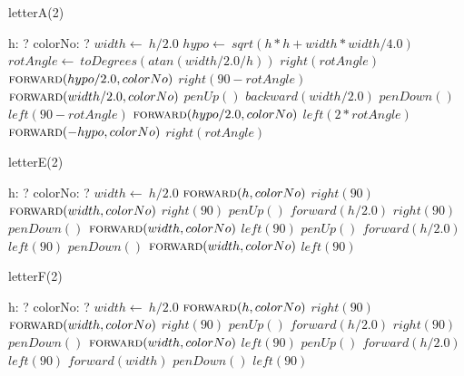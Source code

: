 \documentclass[a4paper,10pt]{article}
\begin{document}
\begin{algorithm}
\caption{letterA(2)}
\begin{algorithmic}[5]
\State {}
\State {}
    \State h: ?
    \State colorNo: ?
  \EndDecl
  \State \(width\gets\ h/2.0\)
  \State \(hypo\gets\ sqrt(h*h+width*width/4.0)\)
  \State \(rotAngle\gets\ toDegrees(atan(width/2.0/h))\)
  \State \(right(rotAngle)\)
  \State \(\Call{forward}{hypo/2.0,colorNo}\)
  \State \(right(90-rotAngle)\)
  \State \(\Call{forward}{width/2.0,colorNo}\)
  \State \(penUp()\)
  \State \(backward(width/2.0)\)
  \State \(penDown()\)
  \State \(left(90-rotAngle)\)
  \State \(\Call{forward}{hypo/2.0,colorNo}\)
  \State \(left(2*rotAngle)\)
  \State \(\Call{forward}{-hypo,colorNo}\)
  \State \(right(rotAngle)\)
\EndProcedure
\end{algorithmic}
\end{algorithm}


\begin{algorithm}
\caption{letterE(2)}
\begin{algorithmic}[5]
\State {}
\State {}
    \State h: ?
    \State colorNo: ?
  \EndDecl
  \State \(width\gets\ h/2.0\)
  \State \(\Call{forward}{h,colorNo}\)
  \State \(right(90)\)
  \State \(\Call{forward}{width,colorNo}\)
  \State \(right(90)\)
  \State \(penUp()\)
  \State \(forward(h/2.0)\)
  \State \(right(90)\)
  \State \(penDown()\)
  \State \(\Call{forward}{width,colorNo}\)
  \State \(left(90)\)
  \State \(penUp()\)
  \State \(forward(h/2.0)\)
  \State \(left(90)\)
  \State \(penDown()\)
  \State \(\Call{forward}{width,colorNo}\)
  \State \(left(90)\)
\EndProcedure
\end{algorithmic}
\end{algorithm}


\begin{algorithm}
\caption{letterF(2)}
\begin{algorithmic}[5]
\State {}
\State {}
    \State h: ?
    \State colorNo: ?
  \EndDecl
  \State \(width\gets\ h/2.0\)
  \State \(\Call{forward}{h,colorNo}\)
  \State \(right(90)\)
  \State \(\Call{forward}{width,colorNo}\)
  \State \(right(90)\)
  \State \(penUp()\)
  \State \(forward(h/2.0)\)
  \State \(right(90)\)
  \State \(penDown()\)
  \State \(\Call{forward}{width,colorNo}\)
  \State \(left(90)\)
  \State \(penUp()\)
  \State \(forward(h/2.0)\)
  \State \(left(90)\)
  \State \(forward(width)\)
  \State \(penDown()\)
  \State \(left(90)\)
\EndProcedure
\end{algorithmic}
\end{algorithm}
\end{document}
